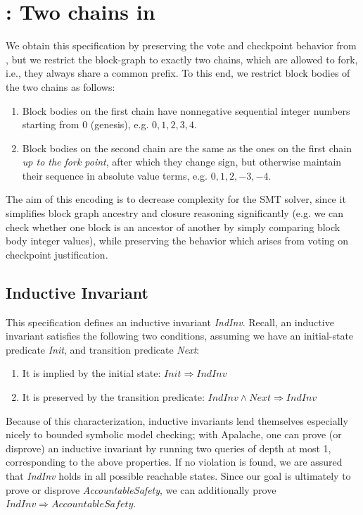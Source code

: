 
\section{\SpecFour{}: Two chains in \tlap{}}\label{sec:spec4}

We obtain this specification by preserving the vote and checkpoint behavior from \SpecThree{}, but we restrict the block-graph to exactly two chains, which are allowed to fork, i.e., they always share a common prefix.
To this end, we restrict block bodies of the two chains as follows:
\begin{enumerate}
	\item Block bodies on the first chain have nonnegative sequential integer numbers starting from 0 (genesis), e.g. $0, 1, 2,3, 4$.
	\item Block bodies on the second chain are the same as the ones on the first chain \emph{up to the fork point}, after which they change sign, but otherwise maintain their sequence in absolute value terms, e.g. $0, 1,2,-3,-4$.
\end{enumerate}

The aim of this encoding is to decrease complexity for the SMT solver, since it simplifies block graph ancestry and closure reasoning significantly (e.g. we can check whether one block is an ancestor of another by simply comparing block body integer values), while preserving the behavior which arises from voting on checkpoint justification.

\subsection{Inductive Invariant}\label{sec:spec4-indinv}

This specification defines an inductive invariant \textit{IndInv}. Recall, an inductive invariant satisfies the following two conditions, assuming we have an initial-state predicate \textit{Init}, and transition predicate \textit{Next}:
\begin{enumerate}
	\item It is implied by the initial state: $\mathit{Init} \Rightarrow \mathit{IndInv}$
	\item It is preserved by the transition predicate: $\mathit{IndInv} \land \mathit{Next} \Rightarrow \mathit{IndInv}$
\end{enumerate}
Because of this characterization, inductive invariants lend themselves especially nicely to bounded symbolic model checking; with Apalache, one can prove (or disprove) an inductive invariant by running two queries of depth at most 1, corresponding to the above properties.
If no violation is found, we are assured that \textit{IndInv} holds in all possible reachable states.
Since our goal is ultimately to prove or disprove \textit{AccountableSafety}, we can additionally prove $\mathit{IndInv} \Rightarrow \mathit{AccountableSafety}$.

